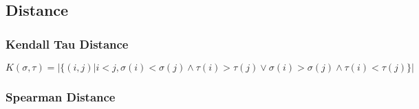 \subsection{Distance}

\subsubsection*{Kendall Tau Distance}

\begin{equation}
K(\sigma,\tau) = | \{(i,j) | i < j, \sigma (i) < \sigma (j) \land \tau (i) > \tau (j) \lor \sigma (i) > \sigma (j) \land \tau (i) < \tau (j) \} |
\end{equation}\citep{rank:aggregation}

\subsubsection*{Spearman Distance}